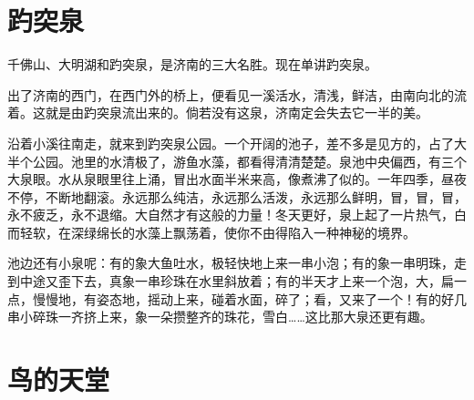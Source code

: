 \documentclass[12pt,UTF-8,openany]{ctexbook}
\begin{document}
\chapter{趵突泉}

\begin{large}
    
    千佛山、大明湖和趵突泉，是济南的三大名胜。现在单讲趵突泉。
    
    出了济南的西门，在西门外的桥上，便看见一溪活水，清浅，鲜洁，由南向北的流着。这就是由趵突泉流出来的。倘若没有这泉，济南定会失去它一半的美。
    
    沿着小溪往南走，就来到趵突泉公园。一个开阔的池子，差不多是见方的，占了大半个公园。池里的水清极了，游鱼水藻，都看得清清楚楚。泉池中央偏西，有三个大泉眼。水从泉眼里往上涌，冒出水面半米来高，像煮沸了似的。一年四季，昼夜不停，不断地翻滚。永远那么纯洁，永远那么活泼，永远那么鲜明，冒，冒，冒，永不疲乏，永不退缩。大自然才有这般的力量！冬天更好，泉上起了一片热气，白而轻软，在深绿绵长的水藻上飘荡着，使你不由得陷入一种神秘的境界。
    
    池边还有小泉呢：有的象大鱼吐水，极轻快地上来一串小泡；有的象一串明珠，走到中途又歪下去，真象一串珍珠在水里斜放着；有的半天才上来一个泡，大，扁一点，慢慢地，有姿态地，摇动上来，碰着水面，碎了；看，又来了一个！有的好几串小碎珠一齐挤上来，象一朵攒整齐的珠花，雪白……这比那大泉还更有趣。
    
\end{large}



\chapter{鸟的天堂}
\end{document}
